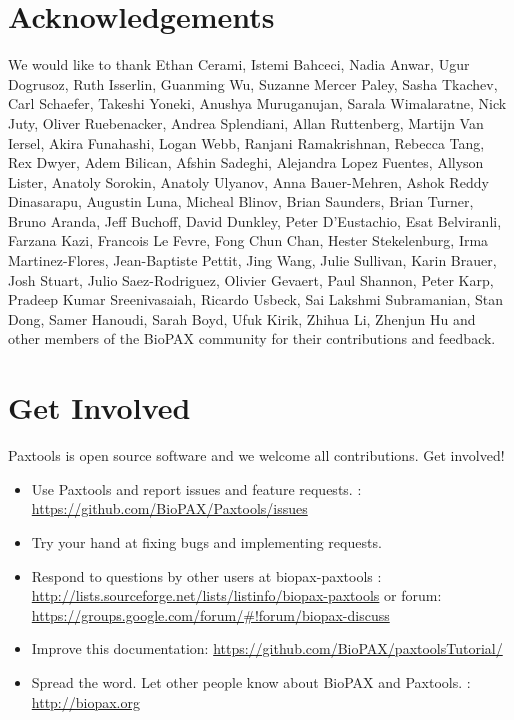 \documentclass{tufte-book}
\begin{document}
\section{Acknowledgements}
We would like to thank Ethan Cerami, Istemi Bahceci, Nadia Anwar, Ugur Dogrusoz, Ruth Isserlin, Guanming Wu, Suzanne Mercer Paley, Sasha Tkachev, Carl Schaefer, Takeshi Yoneki, Anushya Muruganujan, Sarala Wimalaratne, Nick Juty, Oliver Ruebenacker, Andrea Splendiani, Allan Ruttenberg, Martijn Van Iersel, Akira Funahashi, Logan Webb, Ranjani Ramakrishnan, Rebecca Tang, Rex Dwyer, Adem Bilican, Afshin Sadeghi, Alejandra Lopez Fuentes, Allyson Lister, Anatoly Sorokin, Anatoly Ulyanov, Anna Bauer-Mehren, Ashok Reddy Dinasarapu, Augustin Luna, Micheal Blinov, Brian Saunders, Brian Turner, Bruno Aranda, Jeff Buchoff, David Dunkley, Peter D'Eustachio, Esat Belviranli, Farzana Kazi, Francois Le Fevre, Fong Chun Chan, Hester Stekelenburg, Irma Martinez-Flores, Jean-Baptiste Pettit, Jing Wang, Julie Sullivan, Karin Brauer, Josh Stuart, Julio Saez-Rodriguez, Olivier Gevaert, Paul Shannon, Peter Karp, Pradeep Kumar Sreenivasaiah, Ricardo Usbeck, Sai Lakshmi Subramanian, Stan Dong, Samer Hanoudi, Sarah Boyd, Ufuk Kirik, Zhihua Li, Zhenjun Hu and other members of the  BioPAX community for their contributions and feedback.  
\section{Get Involved}
\begin{fullwidth}
Paxtools is open source software and we welcome all contributions.  Get involved! 
\begin{itemize}
\item Use Paxtools and report issues and feature requests. : \url{https://github.com/BioPAX/Paxtools/issues}
\item Try your hand at fixing bugs and implementing requests.
\item Respond to questions by other users at biopax-paxtools : \url{http://lists.sourceforge.net/lists/listinfo/biopax-paxtools} or forum: \url{https://groups.google.com/forum/#!forum/biopax-discuss}
\item Improve this documentation: \url{https://github.com/BioPAX/paxtoolsTutorial/}
\item Spread the word. Let other people know about BioPAX and Paxtools. : \url{http://biopax.org} 
\end{itemize}
\end{fullwidth}


\end{document}
